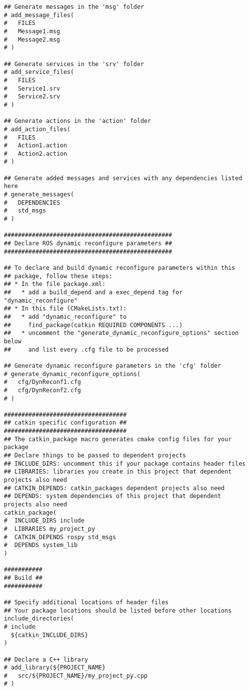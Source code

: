 \documentclass[letterpaper]{article}
\begin{document}
\begin{lstlisting}[style=mystyle, title=src/my\_project\_py/CMakeLists.txt]
## Generate messages in the 'msg' folder
# add_message_files(
#   FILES
#   Message1.msg
#   Message2.msg
# )

## Generate services in the 'srv' folder
# add_service_files(
#   FILES
#   Service1.srv
#   Service2.srv
# )

## Generate actions in the 'action' folder
# add_action_files(
#   FILES
#   Action1.action
#   Action2.action
# )

## Generate added messages and services with any dependencies listed here
# generate_messages(
#   DEPENDENCIES
#   std_msgs
# )

################################################
## Declare ROS dynamic reconfigure parameters ##
################################################

## To declare and build dynamic reconfigure parameters within this
## package, follow these steps:
## * In the file package.xml:
##   * add a build_depend and a exec_depend tag for "dynamic_reconfigure"
## * In this file (CMakeLists.txt):
##   * add "dynamic_reconfigure" to
##     find_package(catkin REQUIRED COMPONENTS ...)
##   * uncomment the "generate_dynamic_reconfigure_options" section below
##     and list every .cfg file to be processed

## Generate dynamic reconfigure parameters in the 'cfg' folder
# generate_dynamic_reconfigure_options(
#   cfg/DynReconf1.cfg
#   cfg/DynReconf2.cfg
# )

###################################
## catkin specific configuration ##
###################################
## The catkin_package macro generates cmake config files for your package
## Declare things to be passed to dependent projects
## INCLUDE_DIRS: uncomment this if your package contains header files
## LIBRARIES: libraries you create in this project that dependent projects also need
## CATKIN_DEPENDS: catkin_packages dependent projects also need
## DEPENDS: system dependencies of this project that dependent projects also need
catkin_package(
#  INCLUDE_DIRS include
#  LIBRARIES my_project_py
#  CATKIN_DEPENDS rospy std_msgs
#  DEPENDS system_lib
)

###########
## Build ##
###########

## Specify additional locations of header files
## Your package locations should be listed before other locations
include_directories(
# include
  ${catkin_INCLUDE_DIRS}
)

## Declare a C++ library
# add_library(${PROJECT_NAME}
#   src/${PROJECT_NAME}/my_project_py.cpp
# )


\end{lstlisting}
\end{document}
